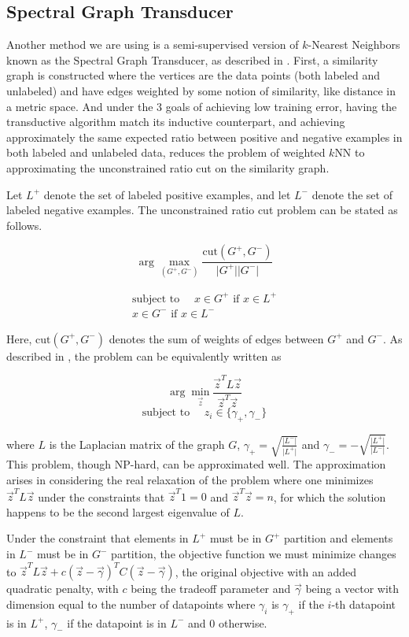 \documentclass[11pt]{article}
\begin{document}
\subsection{Spectral Graph Transducer}

Another method we are using is a semi-supervised version of $k$-Nearest Neighbors known as the Spectral Graph Transducer, as described in \cite{joachims2003transductive}. First, a similarity
graph is constructed where the vertices are the data points (both labeled
and unlabeled) and have edges weighted by some notion of similarity, like
distance in a metric space.
And under the 3 goals of achieving low training error, having the 
transductive algorithm match its inductive counterpart, and achieving
approximately the same expected ratio between positive and negative examples 
in both labeled and unlabeled data, \cite{joachims2003transductive}
reduces the problem of weighted $k$NN to approximating the unconstrained
ratio cut on the similarity graph.

Let $L^+$ denote the set of labeled positive examples, and let
$L^-$ denote the set of labeled negative examples.
The unconstrained ratio cut problem can be stated as follows.

\[\arg\max_{(G^+, G^-)}\frac{\mathrm{cut}(G^+,
G^-)}{\lvert G^+\rvert\lvert G^-\rvert}\]

\begin{align*}
\text{subject to }\quad x\in G^+\text{ if }x\in L^+\\
x\in G^-\text{ if }x\in L^-
\end{align*}

Here, $\mathrm{cut}(G^+, G^-)$ denotes the sum of weights of
edges between $G^+$ and $G^-$. As described in \cite{dhillon2001co}, the problem can be equivalently written as

\[\arg\min_{\vec{z}}\frac{\vec{z}^T L\vec{z}}{\vec{z}^T\vec{z}}\]
\[\text{subject to }\quad z_i\in\{\gamma_+,\gamma_-\}\]

where $L$ is the Laplacian matrix of the graph $G$,
$\gamma_+=\sqrt{\frac{\lvert L^-\rvert}{\lvert L^+\rvert}}$
and $\gamma_-=-\sqrt{\frac{\lvert L^+\rvert}{\lvert L^-\rvert}}$.
This problem, though NP-hard, can
be approximated well. The approximation arises in considering the real relaxation of the problem where one minimizes $\vec{z}^TL\vec{z}$
under the constraints that $\vec{z}^T1=0$ and $\vec{z}^T\vec{z}=n$,
for which the solution happens to be the second largest eigenvalue of
$L$.

Under the constraint that elements in $L^+$ must be in $G^+$
partition and elements in $L^-$ must be in $G^-$ partition,
the objective function we must minimize changes to
$\vec{z}^TL\vec{z}+c(\vec{z}-\vec{\gamma})^TC(\vec{z}-\vec{\gamma})$,
the original objective with an added quadratic penalty, with $c$
being the tradeoff parameter and $\vec{\gamma}$ being a vector
with dimension equal to the number of datapoints where $\gamma_i$
is $\gamma_+$ if the $i$-th datapoint is in $L^+$, $\gamma_-$
if the datapoint is in $L^-$ and 0 otherwise.
\end{document}
